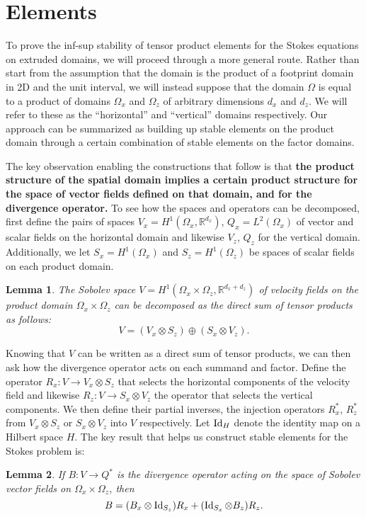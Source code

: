 \documentclass{article}
\theoremstyle{definition}
\theoremstyle{plain}
\newtheorem{lem}{Lemma}
\newcommand{\Id}[1]{\operatorname{Id} #1}
\begin{document}
\section{Elements}

To prove the inf-sup stability of tensor product elements for the Stokes equations on extruded domains, we will proceed through a more general route.
Rather than start from the assumption that the domain is the product of a footprint domain in 2D and the unit interval, we will instead suppose that the domain $\Omega$ is equal to a product of domains $\Omega_x$ and $\Omega_z$ of arbitrary dimensions $d_x$ and $d_z$.
We will refer to these as the ``horizontal'' and ``vertical'' domains respectively.
Our approach can be summarized as building up stable elements on the product domain through a certain combination of stable elements on the factor domains.

The key observation enabling the constructions that follow is that \textbf{the product structure of the spatial domain implies a certain product structure for the space of vector fields defined on that domain, and for the divergence operator.}
To see how the spaces and operators can be decomposed, first define the pairs of spaces $V_x = H^1(\Omega_x, \mathbb{R}^{d_x})$, $Q_x = L^2(\Omega_x)$ of vector and scalar fields on the horizontal domain and likewise $V_z$, $Q_z$ for the vertical domain.
Additionally, we let $S_x = H^1(\Omega_x)$ and $S_z = H^1(\Omega_z)$ be spaces of scalar fields on each product domain.
\begin{lem} The Sobolev space $V = H^1(\Omega_x\times\Omega_z, \mathbb{R}^{d_x + d_z})$ of velocity fields on the product domain $\Omega_x \times \Omega_z$ can be decomposed as the direct sum of tensor products as follows:
\begin{equation}
    V = \left(V_x \otimes S_z\right) \oplus \left(S_x \otimes V_z\right).
    \label{eq:velocity-space-decomposition}
\end{equation}
\end{lem}

Knowing that $V$ can be written as a direct sum of tensor products, we can then ask how the divergence operator acts on each summand and factor.
Define the operator $R_x : V \to V_x \otimes S_z$ that selects the horizontal components of the velocity field and likewise $R_z : V \to S_x\otimes V_z$ the operator that selects the vertical components.
We then define their partial inverses, the injection operators $R_x^*$, $R_z^*$ from $V_x\otimes S_z$ or $S_x\otimes V_z$ into $V$ respectively.
Let $\Id_H$ denote the identity map on a Hilbert space $H$.
The key result that helps us construct stable elements for the Stokes problem is:
\begin{lem} If $B : V \to Q^*$ is the divergence operator acting on the space of Sobolev vector fields on $\Omega_x\times\Omega_z$, then
\begin{equation}
    B = (B_x \otimes \Id_{S_z})R_x + (\Id_{S_x}\otimes B_z)R_z.
    \label{eq:b-decomposition}
\end{equation}
\end{lem}
\end{document}
